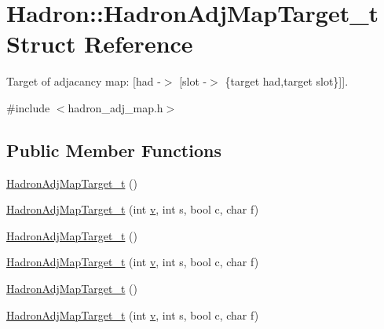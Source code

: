\hypertarget{structHadron_1_1HadronAdjMapTarget__t}{}\section{Hadron\+:\+:Hadron\+Adj\+Map\+Target\+\_\+t Struct Reference}
\label{structHadron_1_1HadronAdjMapTarget__t}


Target of adjacancy map\+: \mbox{[}had -\/$>$ \mbox{[}slot -\/$>$ \{target had,target slot\}\mbox{]}\mbox{]}.  




{\ttfamily \#include $<$hadron\+\_\+adj\+\_\+map.\+h$>$}

\subsection*{Public Member Functions}
\begin{DoxyCompactItemize}
\item 
\mbox{\hyperlink{structHadron_1_1HadronAdjMapTarget__t_a63044628e349d5fdd35356c36d3e2bf3}{Hadron\+Adj\+Map\+Target\+\_\+t}} ()
\item 
\mbox{\hyperlink{structHadron_1_1HadronAdjMapTarget__t_a97e4ef040c8656ca5a431fd88d5f3b56}{Hadron\+Adj\+Map\+Target\+\_\+t}} (int \mbox{\hyperlink{adat__devel_2lib_2hadron_2hadron__timeslice_8cc_a716fc87f5e814be3ceee2405ed6ff22a}{v}}, int s, bool c, char f)
\item 
\mbox{\hyperlink{structHadron_1_1HadronAdjMapTarget__t_a63044628e349d5fdd35356c36d3e2bf3}{Hadron\+Adj\+Map\+Target\+\_\+t}} ()
\item 
\mbox{\hyperlink{structHadron_1_1HadronAdjMapTarget__t_a97e4ef040c8656ca5a431fd88d5f3b56}{Hadron\+Adj\+Map\+Target\+\_\+t}} (int \mbox{\hyperlink{adat__devel_2lib_2hadron_2hadron__timeslice_8cc_a716fc87f5e814be3ceee2405ed6ff22a}{v}}, int s, bool c, char f)
\item 
\mbox{\hyperlink{structHadron_1_1HadronAdjMapTarget__t_a63044628e349d5fdd35356c36d3e2bf3}{Hadron\+Adj\+Map\+Target\+\_\+t}} ()
\item 
\mbox{\hyperlink{structHadron_1_1HadronAdjMapTarget__t_a97e4ef040c8656ca5a431fd88d5f3b56}{Hadron\+Adj\+Map\+Target\+\_\+t}} (int \mbox{\hyperlink{adat__devel_2lib_2hadron_2hadron__timeslice_8cc_a716fc87f5e814be3ceee2405ed6ff22a}{v}}, int s, bool c, char f)
\end{DoxyCompactItemize}
